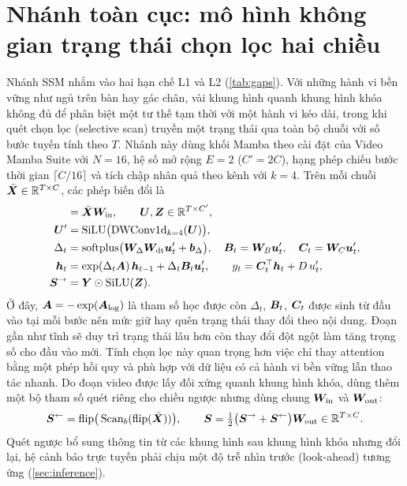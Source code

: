\section{Nhánh toàn cục: mô hình không gian trạng thái chọn lọc hai chiều}
\label{sec:ssm-branch}

Nhánh SSM nhắm vào hai hạn chế L1 và L2 (\cref{tab:gaps}). Với những hành vi bền vững như ngủ trên bàn hay gác chân, vài khung hình quanh khung hình khóa không đủ để phân biệt một tư thế tạm thời với một hành vi kéo dài, trong khi quét chọn lọc (selective scan) truyền một trạng thái qua toàn bộ chuỗi với số bước tuyến tính theo $T$. Nhánh này dùng khối Mamba \cite{gu2023mamba} theo cài đặt  của Video Mamba Suite \cite{chen2024videomambasuite} với $N = 16$, hệ số mở rộng $E = 2$ ($C' = 2C$), hạng phép chiếu bước thời gian $\lceil C/16 \rceil$ và tích chập nhân quả theo kênh với $k = 4$. Trên mỗi chuỗi $\bar{\bm{X}} \in \mathbb{R}^{T \times C}$, các phép biến đổi là
\begin{align}
[\mat{U};\ \mat{Z}] &= \bar{\mat{X}}\mat{W}_{\text{in}}, \qquad \mat{U}, \mat{Z} \in \R^{T \times C'}, \label{eq:mamba-in}\\
\mat{U}' &= \mathrm{SiLU}\big(\mathrm{DWConv1d}_{k=4}(\mat{U})\big), \label{eq:mamba-conv}\\
\Delta_t &= \mathrm{softplus}\big(\mat{W}_\Delta \mat{W}_{\text{dt}} \mat{u}'_t + \mat{b}_\Delta\big), \quad
\mat{B}_t = \mat{W}_B \mat{u}'_t, \quad \mat{C}_t = \mat{W}_C \mat{u}'_t, \label{eq:mamba-sel}\\
\mat{h}_t &= \exp(\Delta_t \mat{A})\,\mat{h}_{t-1} + \Delta_t \mat{B}_t \mat{u}'_t, \qquad
y_t = \mat{C}_t^{\top}\mat{h}_t + D\,u'_t, \label{eq:mamba-scan}\\
\mat{S}^{\rightarrow} &= \mat{Y} \odot \mathrm{SiLU}(\mat{Z}). \label{eq:mamba-gate}
\end{align}
Ở đây, $\bm{A} = -\exp(\bm{A}_{\log})$ là tham số học được còn $\Delta_t$, $\bm{B}_t$, $\bm{C}_t$ được sinh từ đầu vào tại mỗi bước nên mức giữ hay quên trạng thái thay đổi theo nội dung. Đoạn gần như tĩnh sẽ duy trì trạng thái lâu hơn còn thay đổi đột ngột làm tăng trọng số cho đầu vào mới. Tính chọn lọc này quan trọng hơn việc chỉ thay attention bằng một phép hồi quy và phù hợp với dữ liệu có cả hành vi bền vững lẫn thao tác nhanh. Do đoạn video được lấy đối xứng quanh khung hình khóa,  dùng thêm một bộ tham số quét riêng cho chiều ngược nhưng dùng chung $\bm{W}_{\text{in}}$ và $\bm{W}_{\text{out}}$:
\begin{equation}
\bm{S}^{\leftarrow} = \mathrm{flip}\big(\operatorname{Scan}_b(\mathrm{flip}(\bar{\bm{X}}))\big), \qquad
\bm{S} = \tfrac{1}{2}\big(\bm{S}^{\rightarrow} + \bm{S}^{\leftarrow}\big)\bm{W}_{\text{out}} \in \mathbb{R}^{T \times C}.
\label{eq:bimamba}
\end{equation}
Quét ngược bổ sung thông tin từ các khung hình sau khung hình khóa nhưng đổi lại, hệ cảnh báo trực tuyến phải chịu một độ trễ nhìn trước (look-ahead) tương ứng (\cref{sec:inference}).


